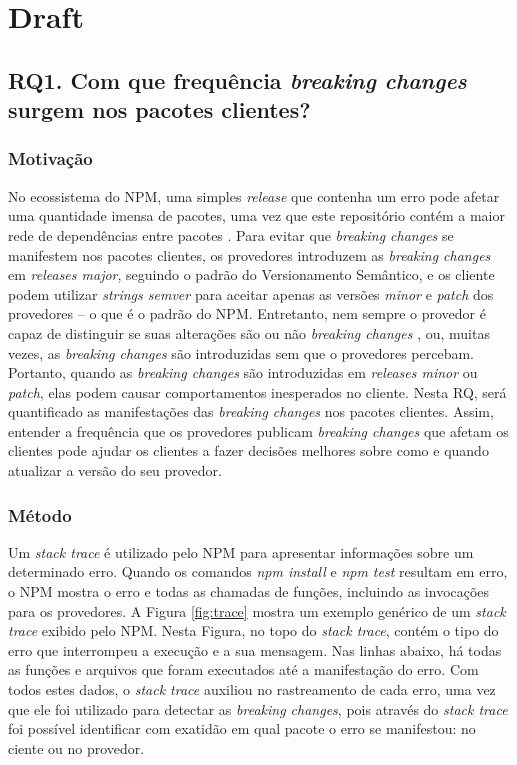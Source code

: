 \chapter{Draft}

\section{RQ1. Com que frequência \textit{breaking changes} surgem nos pacotes clientes?}
\label{sec:rq1}

\subsection{Motivação}
\label{mot:rq1}

No ecossistema do \gls{NPM}, uma simples \textit{release} que contenha um erro pode afetar uma quantidade imensa de pacotes, uma vez que este repositório contém a maior rede de dependências entre pacotes \cite{teorical_reference:npm_2}. Para evitar que \textit{breaking changes} se manifestem nos pacotes clientes, os provedores introduzem as \textit{breaking changes} em \textit{releases major}, seguindo o padrão do Versionamento Semântico, e os cliente podem utilizar \textit{strings semver} para aceitar apenas as versões \textit{minor} e \textit{patch} dos provedores -- o que é o padrão do \gls{NPM}. Entretanto, nem sempre o provedor é capaz de distinguir se suas alterações são ou não \textit{breaking changes} \cite{noregrets2018}, ou, muitas vezes, as \textit{breaking changes} são introduzidas sem que o provedores percebam. Portanto, quando as \textit{breaking changes} são introduzidas em \textit{releases minor} ou \textit{patch}, elas podem causar comportamentos inesperados no cliente. Nesta RQ, será quantificado as manifestações das \textit{breaking changes} nos pacotes clientes. Assim, entender a frequência que os provedores publicam \textit{breaking changes} que afetam os clientes pode ajudar os clientes a fazer decisões melhores sobre como e quando atualizar a versão do seu provedor.

\subsection{Método}
\label{apr:rq1}

Um \textit{stack trace} é utilizado pelo \gls{NPM} para apresentar informações sobre um determinado erro. Quando os comandos \textit{npm install} e \textit{npm test} resultam em erro, o \Gls{NPM} mostra o erro e todas as chamadas de funções, incluindo as invocações para os provedores. A Figura \ref{fig:trace} mostra um exemplo genérico de um \textit{stack trace} exibido pelo \Gls{NPM}. Nesta Figura, no topo do \textit{stack trace}, contém o tipo do erro que interrompeu a execução e a sua mensagem. Nas linhas abaixo, há todas as funções e arquivos que foram executados até a manifestação do erro. Com todos estes dados, o \textit{stack trace} auxiliou no rastreamento de cada erro, uma vez que ele foi utilizado para detectar as \textit{breaking changes}, pois através do \textit{stack trace} foi possível identificar com exatidão em qual pacote o erro se manifestou: no ciente ou no provedor.

